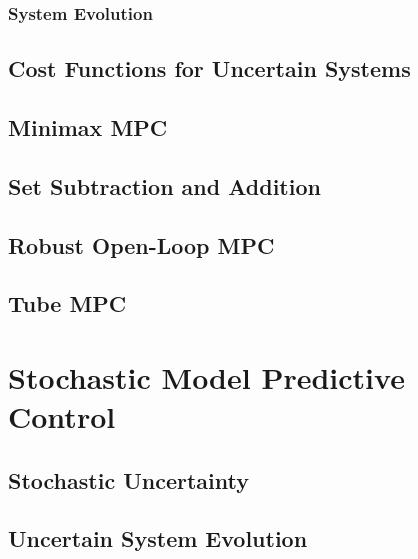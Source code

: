         \subsection{System Evolution} %

    \section{Cost Functions for Uncertain Systems} %

    \section{Minimax MPC} %

    \section{Set Subtraction and Addition} %

    \section{Robust Open-Loop MPC} %

    \section{Tube MPC} %

\chapter{Stochastic Model Predictive Control} %

    \section{Stochastic Uncertainty} %

    \section{Uncertain System Evolution} %

